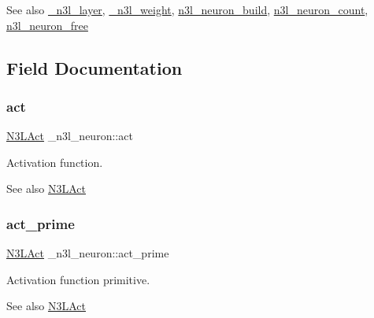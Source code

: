 \begin{DoxySeeAlso}{See also}
\hyperlink{struct__n3l__layer}{\+\_\+n3l\+\_\+layer}, \hyperlink{struct__n3l__weight}{\+\_\+n3l\+\_\+weight}, \hyperlink{n3__neuron_8c_ac384b7dc4f11703a017aecc1a46cd666}{n3l\+\_\+neuron\+\_\+build}, \hyperlink{n3__neuron_8c_ae5ec0481c488f4052ef52f18639327d2}{n3l\+\_\+neuron\+\_\+count}, \hyperlink{n3__neuron_8c_a3f9b33cd97e88140c8adadb483b1cea5}{n3l\+\_\+neuron\+\_\+free} 
\end{DoxySeeAlso}


\subsection{Field Documentation}
\mbox{\label{struct__n3l__neuron_a3ed17ddbe86d42ed6b7d31256b109262}} 
\subsubsection{\texorpdfstring{act}{act}}
{\footnotesize\ttfamily \hyperlink{n3__header_8h_afb10e6f7012513b51225a4d3add36cae}{N3\+L\+Act} \+\_\+n3l\+\_\+neuron\+::act}

Activation function. \begin{DoxySeeAlso}{See also}
\hyperlink{n3__header_8h_afb10e6f7012513b51225a4d3add36cae}{N3\+L\+Act} 
\end{DoxySeeAlso}
\mbox{\label{struct__n3l__neuron_a9c9de65191cb097fd7a71752c83fc3db}} 
\subsubsection{\texorpdfstring{act\+\_\+prime}{act\_prime}}
{\footnotesize\ttfamily \hyperlink{n3__header_8h_afb10e6f7012513b51225a4d3add36cae}{N3\+L\+Act} \+\_\+n3l\+\_\+neuron\+::act\+\_\+prime}

Activation function primitive. \begin{DoxySeeAlso}{See also}
\hyperlink{n3__header_8h_afb10e6f7012513b51225a4d3add36cae}{N3\+L\+Act} 
\end{DoxySeeAlso}
\mbox{\label{struct__n3l__neuron_af424e7accb8d1d089b828a1de69e03a0}} 
